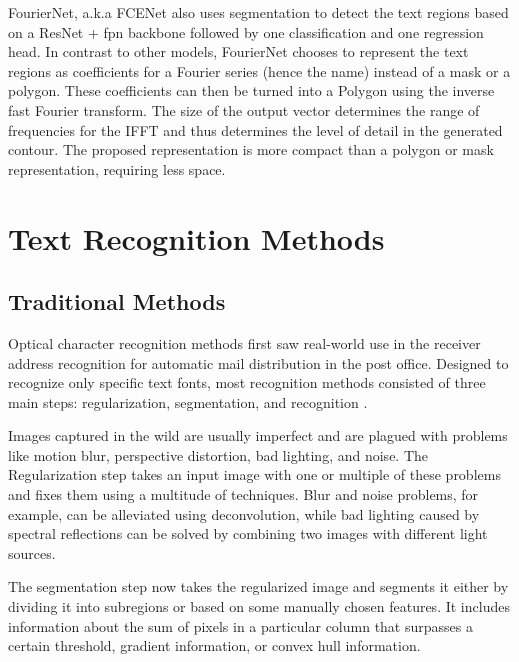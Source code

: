 \label{fcenet}FourierNet, a.k.a FCENet \cite{riaz_fouriernet_2021} also uses segmentation to detect the text regions based on a ResNet + \gls{fpn} backbone followed by one classification and one regression head. In contrast to other models, FourierNet chooses to represent the text regions as coefficients for a Fourier series (hence the name) instead of a mask or a polygon. These coefficients can then be turned into a Polygon using the inverse fast Fourier transform. The size of the output vector determines the range of frequencies for the IFFT and thus determines the level of detail in the generated contour. The proposed representation is more compact than a polygon or mask representation, requiring less space.

\section{Text Recognition Methods}
\subsection{Traditional Methods}
Optical character recognition methods first saw real-world use in the receiver address recognition for automatic mail distribution in the post office. Designed to recognize only specific text fonts, most recognition methods consisted of three main steps: regularization, segmentation, and recognition \cite{wang_object_2021}.

Images captured in the wild are usually imperfect and are plagued with problems like motion blur, perspective distortion, bad lighting, and noise. The Regularization step takes an input image with one or multiple of these problems and fixes them using a multitude of techniques. Blur and noise problems, for example, can be alleviated using deconvolution, while bad lighting caused by spectral reflections can be solved by combining two images with different light sources.

The segmentation step now takes the regularized image and segments it either by dividing it into subregions or based on some manually chosen features. It includes information about the sum of pixels in a particular column that surpasses a certain threshold, gradient information, or convex hull information.

